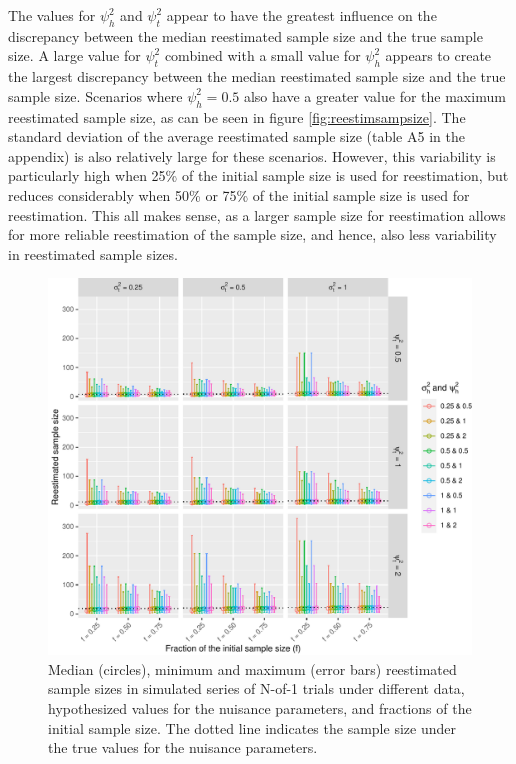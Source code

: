 \documentclass[AMA,STIX1COL,]{WileyNJD-v2}
\begin{document}
The values for \(\psi_h^2\) and \(\psi_t^2\) appear to have the greatest influence on the discrepancy between the median reestimated sample size and the true sample size. A large value for \(\psi_t^2\) combined with a small value for \(\psi_h^2\) appears to create the largest discrepancy between the median reestimated sample size and the true sample size. Scenarios where \(\psi_h^2 = 0.5\) also have a greater value for the maximum reestimated sample size, as can be seen in figure \ref{fig:reestimsampsize}. The standard deviation of the average reestimated sample size (table A5 in the appendix) is also relatively large for these scenarios. However, this variability is particularly high when 25\% of the initial sample size is used for reestimation, but reduces considerably when 50\% or 75\% of the initial sample size is used for reestimation. This all makes sense, as a larger sample size for reestimation allows for more reliable reestimation of the sample size, and hence, also less variability in reestimated sample sizes.

\begin{figure}

{\centering \includegraphics{Thesis_files/figure-latex/unnamed-chunk-8-1} 

}

\caption{Median (circles), minimum and maximum (error bars) reestimated sample sizes in simulated series of N-of-1 trials under different data, hypothesized values for the nuisance parameters, and fractions of the initial sample size. The dotted line indicates the sample size under the true values for the nuisance parameters.\label{fig:reestimsampsize}}\label{fig:unnamed-chunk-8}
\end{figure}
\end{document}
